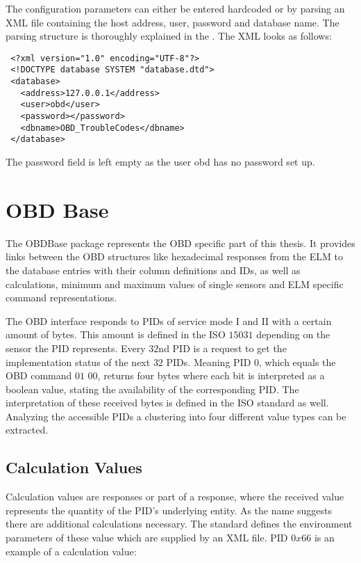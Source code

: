 The configuration parameters can either be entered hardcoded or by parsing an XML file containing the host address, user, password and database 
name. The parsing structure is thoroughly explained in the . The XML looks as follows:

\begin{verbatim}
 <?xml version="1.0" encoding="UTF-8"?>
 <!DOCTYPE database SYSTEM "database.dtd">
 <database>
   <address>127.0.0.1</address>
   <user>obd</user>
   <password></password>
   <dbname>OBD_TroubleCodes</dbname>
 </database>
\end{verbatim}

The password field is left empty as the user obd has no password set up.

\section{OBD Base}
\label{sec:obdbase}
The OBDBase package represents the OBD specific part of this thesis. It provides links between the OBD structures like hexadecimal responses 
from the ELM to the database entries with their column definitions and IDs, as well as calculations, minimum and maximum values of single 
sensors and ELM specific command representations.

The OBD interface responds to PIDs of service mode I and II with a certain amount of bytes. This amount is defined in the ISO $15031$ \cite{ISO15031} depending 
on the sensor the PID represents. Every $32$nd PID is a request to get the implementation status of the next $32$ PIDs. Meaning 
PID $0$, which equals the OBD command $01$ $00$, returns four bytes where each bit is interpreted as a boolean value, stating the availability of the corresponding PID. The 
interpretation of these received bytes is defined in the ISO standard as well. Analyzing the accessible PIDs a clustering into four different value types can be extracted.

\subsection{Calculation Values}
Calculation values are responses or part of a response, where the received value represents the quantity of the PID’s underlying entity. 
As the name suggests there are additional calculations necessary. The standard defines the environment parameters of these value which are 
supplied by an XML file. PID $0x66$ is an example of a calculation value:

